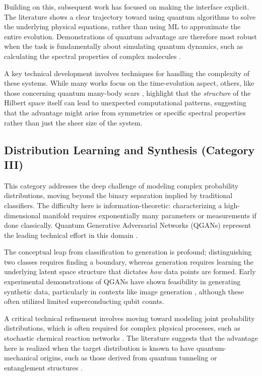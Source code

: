 \documentclass{article}
\begin{document}
Building on this, subsequent work has focused on making the interface explicit. The literature shows a clear trajectory toward using quantum algorithms to solve the underlying physical equations, rather than using ML to approximate the entire evolution. Demonstrations of quantum advantage are therefore most robust when the task is fundamentally about simulating quantum dynamics, such as calculating the spectral properties of complex molecules \cite{mensa2023quantum}.

A key technical development involves techniques for handling the complexity of these systems. While many works focus on the time-evolution aspect, others, like those concerning quantum many-body scars , highlight that the \textit{structure} of the Hilbert space itself can lead to unexpected computational patterns, suggesting that the advantage might arise from symmetries or specific spectral properties rather than just the sheer size of the system.

\subsection{Distribution Learning and Synthesis (Category III)}

\label{sec:distribution\_learning\_and\_synthesis\_cate}

This category addresses the deep challenge of modeling complex probability distributions, moving beyond the binary separation implied by traditional classifiers. The difficulty here is information-theoretic: characterizing a high-dimensional manifold requires exponentially many parameters or measurements if done classically. Quantum Generative Adversarial Networks (QGANs) represent the leading technical effort in this domain \cite{li2020quantum}.

The conceptual leap from classification to generation is profound; distinguishing two classes requires finding a boundary, whereas generation requires learning the underlying latent space structure that dictates \textit{how} data points are formed. Early experimental demonstrations of QGANs have shown feasibility in generating synthetic data, particularly in contexts like image generation \cite{huang2021quantum}, although these often utilized limited superconducting qubit counts.

A critical technical refinement involves moving toward modeling joint probability distributions, which is often required for complex physical processes, such as stochastic chemical reaction networks \cite{mizuno2024finding}. The literature suggests that the advantage here is realized when the target distribution is known to have quantum-mechanical origins, such as those derived from quantum tunneling or entanglement structures .
\end{document}
